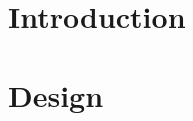 \documentclass[11pt, a4paper, oneside]{Thesis} %
\begin{document}

\part{Introduction}

 

\part{Design}
 
 
 
 




\appendix %

%
%
%


\backmatter


\label{Bibliography}



\end{document}
